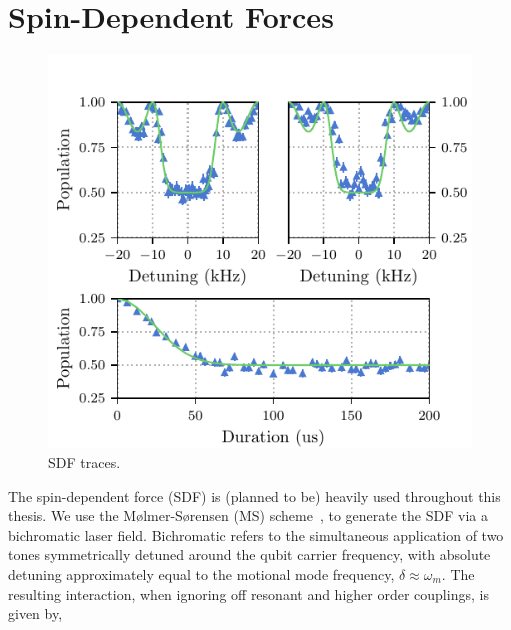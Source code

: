\section{Spin-Dependent Forces}
\label{sec:Spin-Dependent Forces}

    \begin{figure}
        \begin{center}
        \noindent\includegraphics[width=\linewidth]{
            figures/pdf_figure/sdf.pdf
            }
        \end{center}
        \caption{
            SDF traces.
            }
        \label{fig:SDF}
    \end{figure}
    The spin-dependent force (SDF) is (planned to be) heavily used throughout
    this thesis. We use the Mølmer-Sørensen (MS) scheme~\cite{}, to generate the
    SDF via a bichromatic laser field. Bichromatic refers to the simultaneous
    application of two tones symmetrically detuned around the qubit carrier
    frequency, with absolute detuning approximately equal to the motional mode
    frequency, $\delta \approx \omega_{m}$. The resulting interaction, when
    ignoring off resonant and higher order couplings, is given by,

